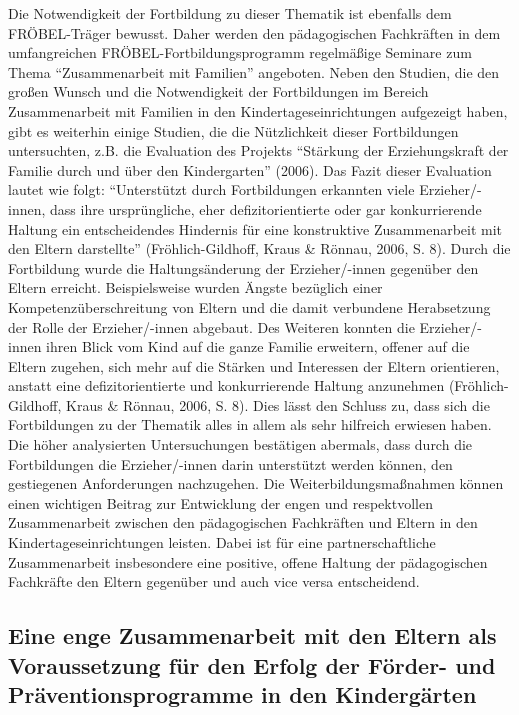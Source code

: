 \documentclass[12pt,a4paper]{article}
\begin{document}
Die Notwendigkeit der Fortbildung zu dieser Thematik ist ebenfalls dem FRÖBEL-Träger bewusst. Daher werden den pädagogischen Fachkräften in dem umfangreichen FRÖBEL-Fortbildungsprogramm regelmäßige Seminare zum Thema "`Zusammenarbeit mit Familien"' angeboten.
Neben den Studien, die den großen Wunsch und die Notwendigkeit der Fortbildungen im Bereich Zusammenarbeit mit Familien in den Kindertageseinrichtungen aufgezeigt haben,  gibt es weiterhin einige Studien, die die Nützlichkeit dieser Fortbildungen untersuchten, z.B. die Evaluation des Projekts "`Stärkung der Erziehungskraft der Familie durch und über den Kindergarten"' (2006). Das Fazit dieser Evaluation lautet wie folgt:  "`Unterstützt durch Fortbildungen erkannten viele Erzieher/-innen, dass ihre ursprüngliche, eher defizitorientierte oder gar konkurrierende Haltung ein entscheidendes Hindernis für eine konstruktive Zusammenarbeit mit den Eltern darstellte"' (Fröhlich-Gildhoff, Kraus \& Rönnau, 2006, S. 8). Durch die Fortbildung wurde die Haltungsänderung der Erzieher/-innen gegenüber den Eltern erreicht. Beispielsweise wurden Ängste bezüglich einer Kompetenzüberschreitung von Eltern und die damit verbundene Herabsetzung der Rolle der Erzieher/-innen abgebaut. Des Weiteren konnten die Erzieher/-innen ihren Blick vom Kind auf die ganze Familie erweitern, offener auf die Eltern zugehen, sich mehr auf die Stärken und Interessen der Eltern orientieren, anstatt eine defizitorientierte und konkurrierende Haltung anzunehmen (Fröhlich-Gildhoff, Kraus \& Rönnau, 2006, S. 8). 
Dies lässt den Schluss zu, dass sich die Fortbildungen zu der Thematik alles in allem als sehr hilfreich erwiesen haben. Die höher analysierten Untersuchungen bestätigen abermals, dass durch die Fortbildungen die Erzieher/-innen darin unterstützt werden können, den gestiegenen Anforderungen nachzugehen. Die Weiterbildungsmaßnahmen können einen wichtigen Beitrag zur Entwicklung der engen und respektvollen Zusammenarbeit zwischen den pädagogischen Fachkräften und Eltern in den Kindertageseinrichtungen leisten. Dabei ist für eine partnerschaftliche Zusammenarbeit insbesondere eine positive, offene Haltung der pädagogischen Fachkräfte den Eltern gegenüber und auch vice versa entscheidend.

\subsection{Eine enge Zusammenarbeit mit den Eltern als Voraussetzung für den Erfolg         
der Förder- und Präventionsprogramme in den Kindergärten} 
\end{document}
